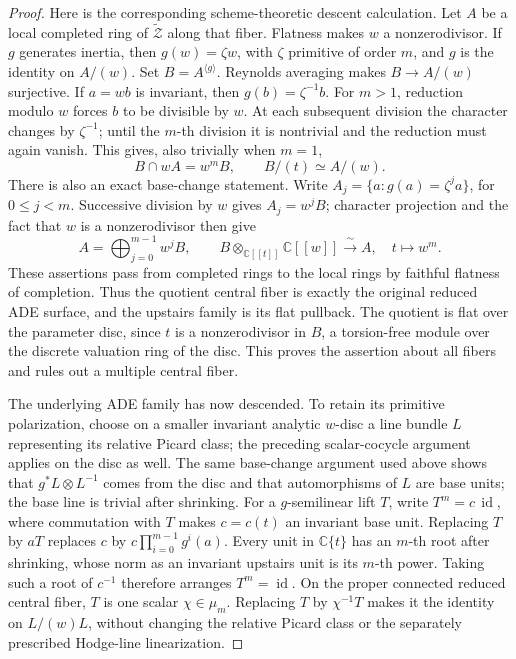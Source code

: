 \documentclass[11pt]{amsart}
\newcommand{\C}{\mathbb C}
\DeclareMathOperator{\id}{id}
\theoremstyle{definition}
\theoremstyle{remark}
\numberwithin{equation}{section}
\begin{document}
\begin{proof}
Here is the corresponding scheme-theoretic descent calculation.  Let
\(A\) be a local completed ring of \(\widetilde{\mathcal Z}\) along that
fiber.  Flatness makes \(w\) a nonzerodivisor.  If \(g\) generates inertia,
then \(g(w)=\zeta w\), with \(\zeta\) primitive of order \(m\), and
\(g\) is the identity on \(A/(w)\).  Set \(B=A^{\langle g\rangle}\).
Reynolds averaging makes \(B\to A/(w)\) surjective.  If \(a=wb\) is
invariant, then \(g(b)=\zeta^{-1}b\).  For \(m>1\), reduction modulo
\(w\) forces \(b\) to be divisible by \(w\).  At each subsequent
division the character changes by \(\zeta^{-1}\); until the \(m\)-th
division it is nontrivial and the reduction must again vanish.  This
gives, also trivially when \(m=1\),
\[
 B\cap wA=w^mB,\qquad B/(t)\simeq A/(w).
\]
There is also an exact base-change statement.  Write
\(A_j=\{a:g(a)=\zeta^j a\}\), for \(0\leq j<m\).
Successive division by \(w\) gives \(A_j=w^jB\); character projection
and the fact that \(w\) is a nonzerodivisor then give
\[
 A=\bigoplus_{j=0}^{m-1}w^jB,
 \qquad
 B\otimes_{\C[[t]]}\C[[w]]\xrightarrow{\ \sim\ }A,
 \quad t\longmapsto w^m.
\]
These assertions pass from completed rings to the local rings by
faithful flatness of completion.  Thus the quotient central fiber is
exactly the original reduced ADE surface, and the upstairs family is
its flat pullback.  The quotient is flat over the parameter disc,
since \(t\) is a nonzerodivisor in \(B\), a torsion-free module over
the discrete valuation ring of the disc.  This proves the assertion
about all fibers and rules out a multiple central fiber.

The underlying ADE family has now descended.  To retain its primitive
polarization, choose on a smaller invariant
analytic \(w\)-disc a line bundle \(L\) representing its relative Picard
class; the preceding scalar-cocycle argument applies on the disc as well.
The same base-change argument used above shows that
\(g^*L\otimes L^{-1}\) comes from the disc and that automorphisms of
\(L\) are base units; the base line is trivial after shrinking.  For a
\(g\)-semilinear lift \(T\), write \(T^m=c\,\id\), where commutation with
\(T\) makes \(c=c(t)\) an invariant base unit.  Replacing \(T\) by
\(aT\) replaces \(c\) by \(c\prod_{i=0}^{m-1}g^i(a)\).  Every unit in
\(\C\{t\}\) has an \(m\)-th root after shrinking, whose norm as an
invariant upstairs unit is its \(m\)-th power.  Taking such a root of
\(c^{-1}\) therefore arranges \(T^m=\id\).  On the proper connected
reduced central fiber, \(T\) is one scalar \(\chi\in\mu_m\).  Replacing
\(T\) by \(\chi^{-1}T\) makes it the identity on \(L/(w)L\), without
changing the relative Picard class or the separately prescribed
Hodge-line linearization.


\end{proof}
\end{document}
